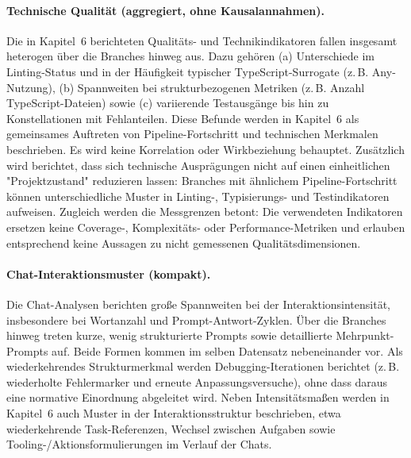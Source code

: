 \paragraph{Technische Qualität (aggregiert, ohne Kausalannahmen).}
Die in Kapitel~6 berichteten Qualitäts- und Technikindikatoren fallen insgesamt heterogen über die Branches hinweg aus.
Dazu gehören (a) Unterschiede im Linting-Status und in der Häufigkeit typischer TypeScript-Surrogate (z.\,B. Any-Nutzung), (b) Spannweiten bei strukturbezogenen Metriken (z.\,B. Anzahl TypeScript-Dateien) sowie (c) variierende Testausgänge bis hin zu Konstellationen mit Fehlanteilen.
Diese Befunde werden in Kapitel~6 als gemeinsames Auftreten von Pipeline-Fortschritt und technischen Merkmalen beschrieben. Es wird keine Korrelation oder Wirkbeziehung behauptet.
Zusätzlich wird berichtet, dass sich technische Ausprägungen nicht auf einen einheitlichen "Projektzustand" reduzieren lassen: Branches mit ähnlichem Pipeline-Fortschritt können unterschiedliche Muster in Linting-, Typisierungs- und Testindikatoren aufweisen.
Zugleich werden die Messgrenzen betont: Die verwendeten Indikatoren ersetzen keine Coverage-, Komplexitäts- oder Performance-Metriken und erlauben entsprechend keine Aussagen zu nicht gemessenen Qualitätsdimensionen.

\paragraph{Chat-Interaktionsmuster (kompakt).}
Die Chat-Analysen berichten große Spannweiten bei der Interaktionsintensität, insbesondere bei Wortanzahl und Prompt-Antwort-Zyklen.
Über die Branches hinweg treten kurze, wenig strukturierte Prompts sowie detaillierte Mehrpunkt-Prompts auf. Beide Formen kommen im selben Datensatz nebeneinander vor.
Als wiederkehrendes Strukturmerkmal werden Debugging-Iterationen berichtet (z.\,B. wiederholte Fehlermarker und erneute Anpassungsversuche), ohne dass daraus eine normative Einordnung abgeleitet wird.
Neben Intensitätsmaßen werden in Kapitel~6 auch Muster in der Interaktionsstruktur beschrieben, etwa wiederkehrende Task-Referenzen, Wechsel zwischen Aufgaben sowie Tooling-/Aktionsformulierungen im Verlauf der Chats.

